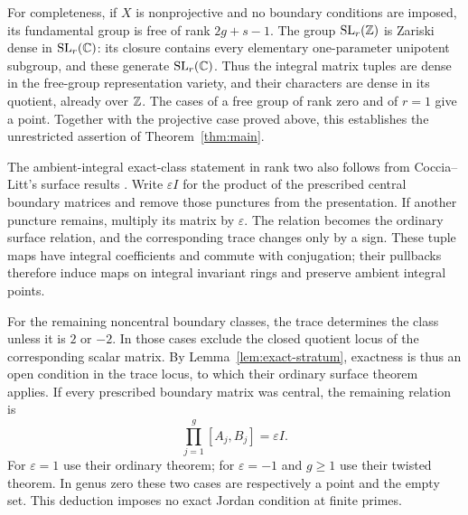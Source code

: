 For completeness, if $X$ is nonprojective and no boundary conditions
are imposed, its fundamental group is free of rank $2g+s-1$.
The group $\operatorname{SL}_r(\mathbb Z)$ is Zariski dense in $\operatorname{SL}_r(\mathbb C)$: its
closure contains every elementary one-parameter unipotent subgroup,
and these generate $\operatorname{SL}_r(\mathbb C)$.  Thus the integral matrix tuples
are dense in the free-group representation variety, and their
characters are dense in its quotient, already over $\mathbb Z$.
The cases of a free group of rank zero and of $r=1$ give a point.
Together with the projective case proved above, this establishes the
unrestricted assertion of Theorem~\ref{thm:main}.

\begin{remark}\label{rem:rank-two-comparison}
The ambient-integral exact-class statement in rank two also follows
from Coccia--Litt's surface results
\cite[Theorems~5.0.4 and~6.1.5]{CocciaLitt}.
Write $\varepsilon I$ for the product of the prescribed central
boundary matrices and remove those punctures from the presentation.
If another puncture remains, multiply its matrix by $\varepsilon$.
The relation becomes the ordinary surface relation, and the corresponding
trace changes only by a sign. These tuple maps have integral coefficients
and commute with conjugation; their pullbacks therefore induce maps on
integral invariant rings and preserve ambient integral points.

For the remaining noncentral boundary classes, the trace determines
the class unless it is $2$ or $-2$. In those cases exclude the closed
quotient locus of the corresponding scalar matrix. By
Lemma~\ref{lem:exact-stratum}, exactness is thus an open condition in
the trace locus, to which their ordinary surface theorem applies.
If every prescribed boundary matrix was central, the remaining
relation is
\[
                 \prod_{j=1}^g[A_j,B_j]=\varepsilon I.
\]
For $\varepsilon=1$ use their ordinary theorem; for
$\varepsilon=-1$ and $g\geq1$ use their twisted theorem. In genus
zero these two cases are respectively a point and the empty set.
This deduction imposes no exact Jordan condition at finite primes.
\end{remark}
